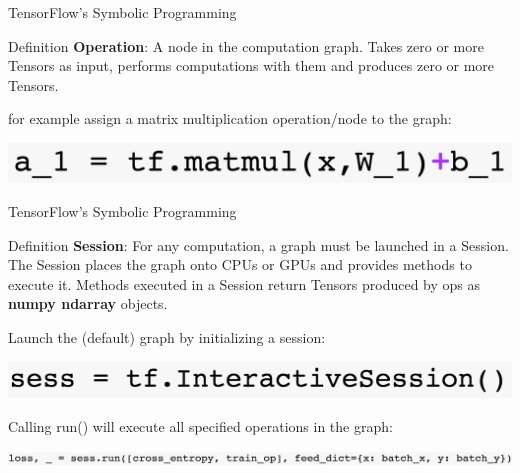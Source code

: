 \documentclass[18pt]{beamer}
\begin{document}
\begin{frame}{TensorFlow's Symbolic Programming}
\begin{block}{Definition}
\textbf{Operation}: A node in the computation graph. Takes zero or more Tensors as input, performs computations with them and produces zero or more Tensors.
\end{block}
for example assign a matrix multiplication operation/node to the graph:
\begin{center}
\includegraphics[scale=0.3]{figures/operation.png}
\end{center}
\end{frame}


\begin{frame}{TensorFlow's Symbolic Programming}
\begin{block}{Definition}
\textbf{Session}: For any computation, a graph must be launched in a Session. The Session places the graph onto CPUs or GPUs and provides methods to execute it. Methods executed in a Session return Tensors produced by ops as \textbf{numpy ndarray} objects.
\end{block}
Launch the (default) graph by initializing a session:
\begin{center}
\includegraphics[scale=0.3]{figures/sess1.png}
\end{center}
Calling run() will execute all specified operations in the graph:
\begin{center}
\includegraphics[scale=0.21]{figures/sess2.png}
\end{center}
\end{frame}
\end{document}
